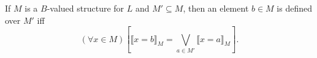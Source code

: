 If $M$ is a $B$-valued structure for $L$ and $M' \subseteq M$, then an element $b \in M$ is defined over $M'$ iff
$$(\forall x \in M)[\llbracket x = b \rrbracket_M = \bigvee_{a \in M'} \llbracket x = a \rrbracket_M].$$
